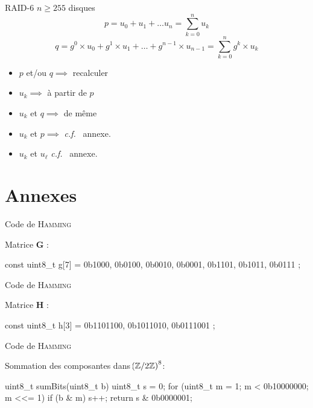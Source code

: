 \documentclass[french,bookmarks,aspectratio=43]{beamer}
\newcommand{\bdZ}{\mathbb{Z}}
\newcommand{\bbG}{\mathbf{G}}
\newcommand{\bbH}{\mathbf{H}}
\newcommand{\cf}{\textit{\rmfamily c.f.} \ }
\begin{document}
\begin{frame}{RAID-6}
    $n \geq 255$ disques
    \[ p = u_0 + u_1 + \dots u_n = \sum_{k=0}^n u_k\]\pause
    \[ q = g^0 \times u_0 + g^1 \times u_1 + \dots + g^{n-1} \times u_{n-1} = \sum_{k=0}^n g^k \times u_k\]\pause
    \begin{itemize}
        \item $p$ et/ou $q \implies$ recalculer\pause

        \item $u_k \implies$ à partir de $p$\pause

        \item $u_k$ et $q \implies$ de même\pause

        \item $u_k$ et $p \implies$ \cf annexe.\pause

        \item $u_k$ et $u_\ell$ \cf annexe.\pause
    \end{itemize}

\end{frame}

\section{Annexes}

\begin{frame}[fragile]{Code de \textsc{Hamming}}

Matrice $\bbG$ :
    \begin{C}
const uint8_t g[7] =
        {
                0b1000,
                0b0100,
                0b0010,
                0b0001,
                0b1101,
                0b1011,
                0b0111
        };
    \end{C}
\end{frame}

\begin{frame}[fragile]{Code de \textsc{Hamming}}

Matrice $\bbH$ :
    \begin{C}
const uint8_t h[3] =
        {
            0b1101100,
            0b1011010,
            0b0111001
        };
    \end{C}
\end{frame}

\begin{frame}[fragile]{Code de \textsc{Hamming}}

Sommation des composantes dans $\p{\bdZ/2\bdZ}^8$:
    \begin{C}
uint8_t sumBits(uint8_t b)
{
    uint8_t s = 0;
    for (uint8_t m = 1; m < 0b10000000; m <<= 1) {
        if (b & m) s++;
    }
    return s & 0b0000001;
}
    \end{C}
\end{frame}
\end{document}

